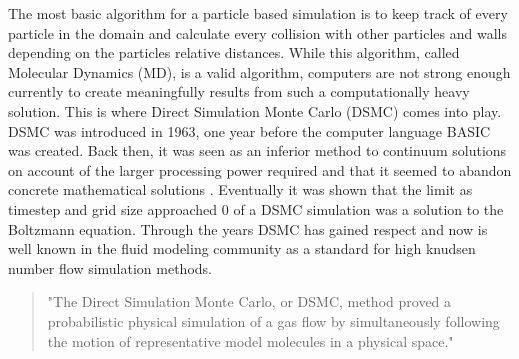 \indent The most basic algorithm for a particle based simulation is to keep track of every particle in the domain and calculate every collision with other particles and walls depending on the particles relative distances. While this algorithm, called Molecular Dynamics (MD), is a valid algorithm, computers are not strong enough currently to create meaningfully results from such a computationally heavy solution. This is where Direct Simulation Monte Carlo (DSMC) comes into play. DSMC was introduced in 1963\cite{dsmc_speed}, one year before the computer language BASIC was created\cite{basic}. Back then, it was seen as an inferior method to continuum solutions on account of the larger processing power required and that it seemed to abandon concrete mathematical solutions \cite{dsmc_speed}. Eventually it was shown that the limit as timestep and grid size approached 0 of a DSMC simulation was a solution to the Boltzmann equation\cite{bird_dsmc}. Through the years DSMC has gained respect and now is well known in the fluid modeling community as a standard for high knudsen number flow simulation methods.\par

\begin{quote}
    "The Direct Simulation Monte Carlo, or DSMC, method proved a probabilistic physical simulation of a gas flow by simultaneously following the motion of representative model molecules in a physical space." \cite{bird_dsmc}
\end{quote}


